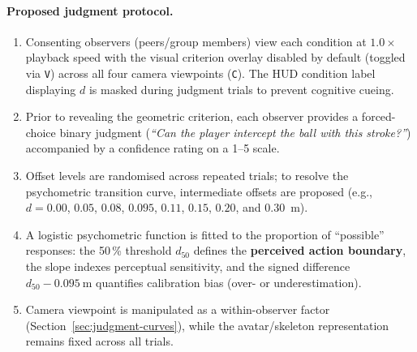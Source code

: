 \paragraph{Proposed judgment protocol.}
\begin{enumerate}
    \item Consenting observers (peers/group members) view each condition at $1.0\times$ playback speed with the visual criterion overlay disabled by default (toggled via \texttt{V}) across all four camera viewpoints (\texttt{C}). The HUD condition label displaying $d$ is masked during judgment trials to prevent cognitive cueing.
    \item Prior to revealing the geometric criterion, each observer provides a forced-choice binary judgment (\emph{``Can the player intercept the ball with this stroke?''}) accompanied by a confidence rating on a 1--5 scale.
    \item Offset levels are randomised across repeated trials; to resolve the psychometric transition curve, intermediate offsets are proposed (e.g., $d=0.00$, $0.05$, $0.08$, $0.095$, $0.11$, $0.15$, $0.20$, and \SI{0.30}{\meter}).
    \item A logistic psychometric function is fitted to the proportion of ``possible'' responses: the 50\,\% threshold $d_{50}$ defines the \textbf{perceived action boundary}, the slope indexes perceptual sensitivity, and the signed difference $d_{50}-\SI{0.095}{\meter}$ quantifies calibration bias (over- or underestimation).
    \item Camera viewpoint is manipulated as a within-observer factor (Section~\ref{sec:judgment-curves}), while the avatar/skeleton representation remains fixed across all trials.
\end{enumerate}
